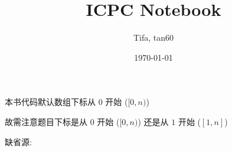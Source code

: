 \documentclass{ICPCnotebook}
\title{\vspace{-4ex}\Large{ICPC Notebook}}
\author{Tifa, tan60}
\date{\today}
\begin{document}
    \maketitle

    \pagestyle{plain}

	\setcounter{page}{1}

    \begin{multicols}{2}
        \tableofcontents
    \end{multicols}

    \newpage
    本书代码默认数组下标从 \(0\) 开始 (\([0, n)\))

    故需注意题目下标是从 \(0\) 开始 (\([0, n)\)) 还是从 \(1\) 开始 (\([1, n]\))

    缺省源:

    \inputminted{cpp}{src/src/main.cpp}

    \newpage
	\pagestyle{fancy}
	\setcounter{page}{1}

    
    

    
    
\end{document}
